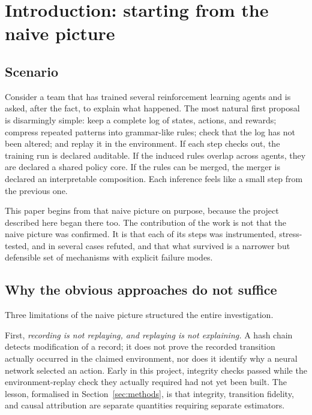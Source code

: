 \documentclass[11pt,a4paper]{article}
\theoremstyle{definition}
\begin{document}
\tableofcontents
\newpage

\section{Introduction: starting from the naive picture}

\subsection{Scenario}

Consider a team that has trained several reinforcement learning agents and is
asked, after the fact, to explain what happened. The most natural first
proposal is disarmingly simple: keep a complete log of states, actions, and
rewards; compress repeated patterns into grammar-like rules; check that the
log has not been altered; and replay it in the environment. If each step
checks out, the training run is declared auditable. If the induced rules
overlap across agents, they are declared a shared policy core. If the rules
can be merged, the merger is declared an interpretable composition. Each
inference feels like a small step from the previous one.

This paper begins from that naive picture on purpose, because the project
described here began there too. The contribution of the work is not that the
naive picture was confirmed. It is that each of its steps was instrumented,
stress-tested, and in several cases refuted, and that what survived is a
narrower but defensible set of mechanisms with explicit failure modes.

\subsection{Why the obvious approaches do not suffice}

Three limitations of the naive picture structured the entire investigation.

First, \emph{recording is not replaying, and replaying is not explaining.}
A hash chain detects modification of a record; it does not prove the recorded
transition actually occurred in the claimed environment, nor does it identify
why a neural network selected an action. Early in this project, integrity
checks passed while the environment-replay check they actually required had
not yet been built. The lesson, formalised in Section~\ref{sec:methods}, is
that integrity, transition fidelity, and causal attribution are separate
quantities requiring separate estimators.
\end{document}
